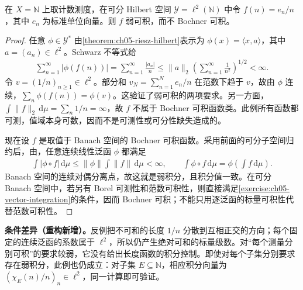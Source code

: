 \documentclass[../../main.tex]{subfiles}
\begin{document}
\begin{example*}\label{example:ch05-weak-not-bochner}
在 $X=\mathbb N$ 上取计数测度，在可分 Hilbert 空间 $\mathscr Y=\ell^2(\mathbb N)$ 中令 $f(n)=e_n/n$，其中 $e_n$ 为标准单位向量。则 $f$ 弱可积，而不 Bochner 可积。
\end{example*}
\begin{proof}
任意 $\phi\in\mathscr Y^*$ 由\cref{theorem:ch05-riesz-hilbert}表示为 $\phi(x)=\langle x,a\rangle$，其中 $a=(a_n)\in\ell^2$。Schwarz 不等式给
\begin{align*}
\sum_{n=1}^{\infty}|\phi(f(n))|
=\sum_{n=1}^{\infty}\frac{|a_n|}{n}
\leqslant\|a\|_2\left(\sum_{n=1}^{\infty}\frac1{n^2}\right)^{1/2}<\infty.
\end{align*}
令 $v=(1/n)_{n\geqslant1}\in\ell^2$。部分和 $v_N=\sum_{n=1}^Ne_n/n$ 在范数下趋于 $v$，故由 $\phi$ 连续，$\sum_n\phi(f(n))=\phi(v)$。这验证了弱可积的两项要求。另一方面，$\int\|f\|_2\,\mathrm d\mu=\sum_n1/n=\infty$，故 $f$ 不属于 Bochner 可积函数类。此例所有函数都可测，值域本身可数，因而不是可测性或可分性缺失造成的。

现在设 $f$ 是取值于 Banach 空间的 Bochner 可积函数。采用前面的可分子空间归约后，由，任意连续线性泛函 $\phi$ 都满足
\begin{align*}
\int|\phi\circ f|\,\mathrm d\mu\leqslant\|\phi\|\int\|f\|\,\mathrm d\mu<\infty,
\qquad
\int\phi\circ f\,\mathrm d\mu=\phi\left(\int f\,\mathrm d\mu\right).
\end{align*}
Banach 空间的连续对偶分离点，故这就是弱积分，且积分值一致。在可分 Banach 空间中，若另有 Borel 可测性和范数可积性，则直接满足\cref{exercise:ch05-vector-integration}的条件，因而 Bochner 可积；不能只用逐泛函的标量可积性代替范数可积性。
\end{proof}
\begin{remark}
\textbf{条件差异（重构新增）。}反例把不可和的长度 $1/n$ 分散到互相正交的方向；每个固定的连续泛函的系数属于 $\ell^2$，所以仍产生绝对可和的标量级数。对“每个测量分别可积”的要求较弱，它没有给出长度函数的积分控制。即使对每个子集分别要求存在弱积分，此例也仍成立：对子集 $E\subseteq\mathbb N$，相应积分向量为 $(\chi_E(n)/n)_n\in\ell^2$，同一计算即可验证。
\end{remark}
\end{document}
